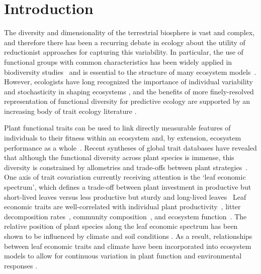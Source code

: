 \section{Introduction}\label{sec:mvtraits-intro}

The diversity and dimensionality of the terrestrial biosphere is vast and complex, and therefore there has been a recurring debate in ecology about the utility of reductionist approaches for capturing this variability.
In particular, the use of functional groups with common characteristics has been widely applied in biodiversity studies~\cite{naeem_disentangling_2003} and is essential to the structure of many ecosystem models~\cite{lavorel_plant_1997,wullschleger_plant_2014}.
However, ecologists have long recognized the importance of individual variability and stochasticity in shaping ecosystems%
\cite{gleason_individualistic_1926,bolnick_why_2011,rosindell_unified_2011,clark_why_2016},
and the benefits of more finely-resolved representation of functional diversity for predictive ecology are supported by an increasing body of trait ecology literature%
\cite{mayfield_diversity_2006,mcmahon_improving_2011,van_bodegom_going_2012,reichstein_linking_2014,violle_emergence_2014,medlyn_using_2015,moran_intraspecific_2016}.

Plant functional traits can be used to link directly measurable features of individuals to their fitness within an ecosystem and, by extension, ecosystem performance as a whole~\cite{violle_let_2007}.
Recent syntheses of global trait databases have revealed that although the functional diversity across plant species is immense, this diversity is constrained by allometries and trade-offs between plant strategies~\cite{wright_worldwide_2004,kattge_try_2011,kleyer_why_2015,diaz_global_2016}.
One axis of trait covariation currently receiving attention is the ‘leaf economic spectrum’, which defines a trade-off between plant investment in productive but short-lived leaves versus less productive but sturdy and long-lived leaves~\cite{wright_worldwide_2004,shipley_fundamental_2006,reich_world-wide_2014,diaz_global_2016}
Leaf economic traits are well-correlated with
individual plant productivity~\cite{shipley_functional_2005,niinemets_within-canopy_2016,wu_convergence_2016},
litter decomposition rates~\cite{bakker_leaf_2011,hobbie_plant_2015},
community composition~\cite{burns_patterns_2004,cavender-bares_multiple_2004},
and ecosystem function~\cite{diaz_plant_2004,musavi_imprint_2015}.
The relative position of plant species along the leaf economic spectrum has been shown to be influenced by climate and soil conditions%
\cite{wright_worldwide_2004,wright_modulation_2005,cornwell_community_2009,ordonez_global_2009,wigley_leaf_2016}.
As a result, relationships between leaf economic traits and climate have been incorporated into ecosystem models to allow for continuous variation in plant function and environmental responses%
\cite{sakschewski_leaf_2015,verheijen_inclusion_2015}.

